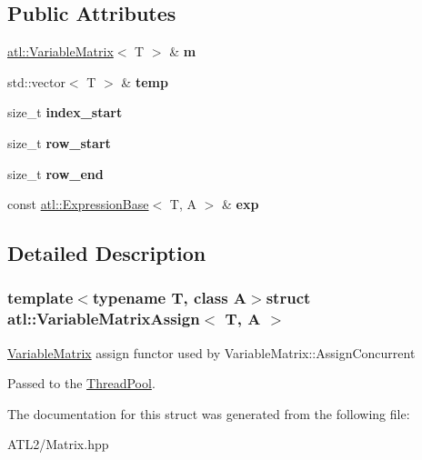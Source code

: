 \subsection*{Public Attributes}
\begin{DoxyCompactItemize}
\item 
\hypertarget{structatl_1_1_variable_matrix_assign_a280d897827baf4d5f8c9330c685fb30a}{\hyperlink{structatl_1_1_variable_matrix}{atl\+::\+Variable\+Matrix}$<$ T $>$ \& {\bfseries m}}\label{structatl_1_1_variable_matrix_assign_a280d897827baf4d5f8c9330c685fb30a}

\item 
\hypertarget{structatl_1_1_variable_matrix_assign_ae1bca9be06be10edda65be5481ccb492}{std\+::vector$<$ T $>$ \& {\bfseries temp}}\label{structatl_1_1_variable_matrix_assign_ae1bca9be06be10edda65be5481ccb492}

\item 
\hypertarget{structatl_1_1_variable_matrix_assign_a89ec828ff2ab980b96fa1009435f5368}{size\+\_\+t {\bfseries index\+\_\+start}}\label{structatl_1_1_variable_matrix_assign_a89ec828ff2ab980b96fa1009435f5368}

\item 
\hypertarget{structatl_1_1_variable_matrix_assign_af4c19cad478dc118dd518a58a2153c15}{size\+\_\+t {\bfseries row\+\_\+start}}\label{structatl_1_1_variable_matrix_assign_af4c19cad478dc118dd518a58a2153c15}

\item 
\hypertarget{structatl_1_1_variable_matrix_assign_a6512cb9f5edc097e7c8a847fb51a34a2}{size\+\_\+t {\bfseries row\+\_\+end}}\label{structatl_1_1_variable_matrix_assign_a6512cb9f5edc097e7c8a847fb51a34a2}

\item 
\hypertarget{structatl_1_1_variable_matrix_assign_a2295877822cacf14a56fb19393993640}{const \hyperlink{structatl_1_1_expression_base}{atl\+::\+Expression\+Base}$<$ T, A $>$ \& {\bfseries exp}}\label{structatl_1_1_variable_matrix_assign_a2295877822cacf14a56fb19393993640}

\end{DoxyCompactItemize}


\subsection{Detailed Description}
\subsubsection*{template$<$typename T, class A$>$struct atl\+::\+Variable\+Matrix\+Assign$<$ T, A $>$}

\hyperlink{structatl_1_1_variable_matrix}{Variable\+Matrix} assign functor used by Variable\+Matrix\+::\+Assign\+Concurrent

Passed to the \hyperlink{classatl_1_1_thread_pool}{Thread\+Pool}. 

The documentation for this struct was generated from the following file\+:\begin{DoxyCompactItemize}
\item 
A\+T\+L2/Matrix.\+hpp\end{DoxyCompactItemize}
